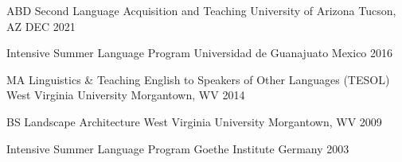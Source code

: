 



\begin{cvhonors}

\cvhonor
{ABD Second Language Acquisition and Teaching} %
{University of Arizona} %
{Tucson, AZ} %
{DEC 2021} %

\cvhonor
{Intensive Summer Language Program} %
{Universidad de Guanajuato} %
{Mexico} %
{2016} %

\cvhonor
{MA Linguistics \& Teaching English to Speakers of Other Languages (TESOL)} %
{West Virginia University} %
{Morgantown, WV} %
{2014} %

\cvhonor
{BS Landscape Architecture} %
{West Virginia University} %
{Morgantown, WV} %
{2009} %

\cvhonor
{Intensive Summer Language Program} %
{Goethe Institute} %
{Germany} %
{2003} %


\end{cvhonors}


